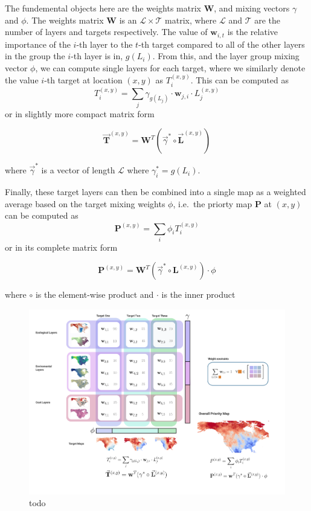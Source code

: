 \documentclass[10pt,oneside]{article}
\makeatletter
\def\maxwidth{\ifdim\Gin@nat@width>\linewidth\linewidth
\else\Gin@nat@width\fi}
\let\Oldincludegraphics\includegraphics
\renewcommand{\includegraphics}[1]{\Oldincludegraphics[width=\maxwidth]{#1}}
\makeatother
\begin{document}
The fundemental objects here are the weights matrix \(\mathbf{W}\), and
mixing vectors \(\gamma\) and \(\phi\). The weights matrix
\(\mathbf{W}\) is an \(\mathcal{L} \times \mathcal{T}\) matrix, where
\(\mathcal{L}\) and \(\mathcal{T}\) are the number of layers and targets
respectively. The value of \(\mathbf{w}_{i,t}\) is the relative
importance of the \(i\)-th layer to the \(t\)-th target compared to all
of the other layers in the group the \(i\)-th layer is in, \(g(L_i)\).
From this, and the layer group mixing vector \(\phi\), we can compute
single layers for each target, where we similarly denote the value
\(i\)-th target at location \((x,y)\) as \(T_i^{(x,y)}\). This can be
computed as \[T_i^{(x,y)} = \sum_j \gamma_{g(L_j)}
\cdot \mathbf{w}_{j,i} \cdot L_j^{(x,y)}\]or in slightly more compact
matrix form

\[\vec{\mathbf{T}}^{(x,y)} = \mathbf{W}^T(\vec{\gamma}^* \circ \vec{\mathbf{L}}^{(x,y)})\]

where \(\vec{\gamma}^*\) is a vector of length \(\mathcal{L}\) where
\(\gamma_i^* = g(L_i)\).

Finally, these target layers can then be combined into a single map as a
weighted average based on the target mixing weights \(\phi\), i.e.~the
priorty map \(\mathbf{P}\) at \((x,y)\) can be computed as
\[\mathbf{P}^{(x,y)} = \sum_i \phi_i
T_i^{(x,y)}\] or in its complete matrix form

\[\mathbf{P}^{(x,y)} = \mathbf{W}^T (\vec{\gamma}^* \circ \mathbf{L}^{(x,y)}) \cdot \phi \]

where \(\circ\) is the element-wise product and \(\cdot\) is the inner
product

\begin{figure}
\hypertarget{fig:concept}{%
\centering
\includegraphics{./figures/weights_concept.png}
\caption{todo}\label{fig:concept}
}
\end{figure}
\end{document}
